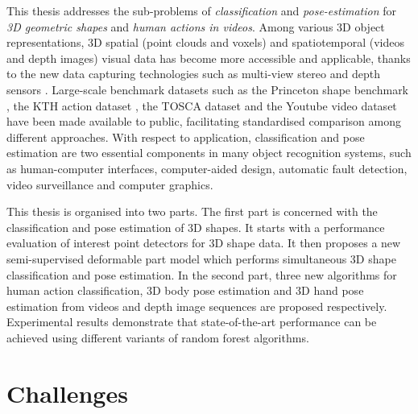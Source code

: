 This thesis addresses the sub-problems of \emph{classification} and \emph{pose-estimation} for \emph{3D geometric shapes} and \emph{human actions in videos}. 
Among various 3D object representations, 3D spatial (\eg point clouds and voxels) and spatiotemporal (\eg videos and depth images) visual data has become more accessible and applicable, thanks to the new data capturing technologies such as multi-view stereo \cite{Vogiatzis2011} and depth sensors \cite{Shotton2011}.  
Large-scale benchmark datasets such as the Princeton shape benchmark \cite{Shilane2004}, the KTH action dataset \cite{Schuldt2004}, the TOSCA dataset \cite{Bronstein2011} and the Youtube video dataset \cite{Liu2009} have been made available to public, facilitating standardised comparison among different approaches.
With respect to application, classification and pose estimation are two essential components in many object recognition systems, such as human-computer interfaces, computer-aided design, automatic fault detection, video surveillance and computer graphics. 

This thesis is organised into two parts.  
The first part is concerned with the classification and pose estimation of 3D shapes. 
It starts with a performance evaluation of interest point detectors for 3D shape data. 
It then proposes a new semi-supervised deformable part model which performs simultaneous 3D shape classification and pose estimation. 
In the second part, three new algorithms for human action classification, 3D body pose estimation and 3D hand pose estimation from videos and depth image sequences are proposed respectively. Experimental results demonstrate that state-of-the-art performance can be achieved using different variants of random forest algorithms.  

\section{Challenges}

